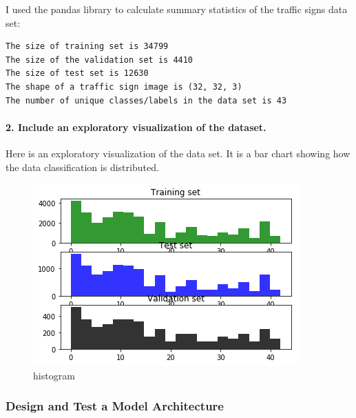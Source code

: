 \documentclass[11pt]{article}
\makeatletter
\def\maxwidth{\ifdim\Gin@nat@width>\linewidth\linewidth
    \else\Gin@nat@width\fi}
\let\Oldincludegraphics\includegraphics
\renewcommand{\includegraphics}[1]{\Oldincludegraphics[width=.8\maxwidth]{#1}}
\makeatother
\begin{document}
I used the pandas library to calculate summary statistics of the traffic
signs data set:

\begin{verbatim}
The size of training set is 34799
The size of the validation set is 4410
The size of test set is 12630
The shape of a traffic sign image is (32, 32, 3)
The number of unique classes/labels in the data set is 43
\end{verbatim}

\paragraph{2. Include an exploratory visualization of the
dataset.}\label{include-an-exploratory-visualization-of-the-dataset.}

Here is an exploratory visualization of the data set. It is a bar chart
showing how the data classification is distributed.

\begin{figure}
\centering
\includegraphics{histogram.png}
\caption{histogram}
\end{figure}

\subsubsection{Design and Test a Model
Architecture}\label{design-and-test-a-model-architecture}
\end{document}
